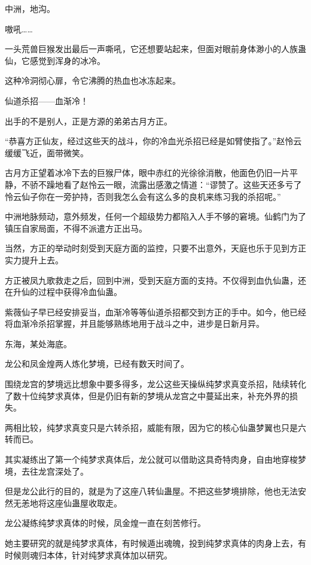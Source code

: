 
\begin{this_body}



中洲，地沟。

嗷吼……

一头荒兽巨猴发出最后一声嘶吼，它还想要站起来，但面对眼前身体渺小的人族蛊仙，它感觉到浑身的冰冷。

这种冷洞彻心扉，令它沸腾的热血也冰冻起来。

仙道杀招——血渐冷！

出手的不是别人，正是方源的弟弟古月方正。

“恭喜方正仙友，经过这些天的战斗，你的冷血光杀招已经是如臂使指了。”赵怜云缓缓飞近，面带微笑。

古月方正望着冰冷下去的巨猴尸体，眼中赤红的光徐徐消散，他面色仍旧一片平静，不骄不躁地看了赵怜云一眼，流露出感激之情道：“谬赞了。这些天还多亏了怜云仙子你在一旁护持，否则我怎么会有这么多的良机来练习我的杀招呢。”

中洲地脉频动，意外频发，任何一个超级势力都陷入人手不够的窘境。仙鹤门为了镇压自家局面，不得不派遣方正出马。

当然，方正的举动时刻受到天庭方面的监控，只要不出意外，天庭也乐于见到方正实力提升上去。

方正被凤九歌救走之后，回到中洲，受到天庭方面的支持。不仅得到血仇仙蛊，还在升仙的过程中获得冷血仙蛊。

紫薇仙子早已经安排妥当，血渐冷等等仙道杀招都交到方正的手中。如今，他已经将血渐冷杀招掌握，并且能够熟练地用于战斗之中，进步是日新月异。

东海，某处海底。

龙公和凤金煌两人炼化梦境，已经有数天时间了。

围绕龙宫的梦境远比想象中要多得多，龙公这些天操纵纯梦求真变杀招，陆续转化了数十位纯梦求真体，但是仍旧有新的梦境从龙宫之中蔓延出来，补充外界的损失。

两相比较，纯梦求真变只是六转杀招，威能有限，因为它的核心仙蛊梦翼也只是六转而已。

其实凝练出了第一个纯梦求真体后，龙公就可以借助这具奇特肉身，自由地穿梭梦境，去往龙宫深处了。

但是龙公此行的目的，就是为了这座八转仙蛊屋。不把这些梦境排除，他也无法安然无恙地将这座仙蛊屋收取走。

龙公凝练纯梦求真体的时候，凤金煌一直在刻苦修行。

她主要研究的就是纯梦求真体，有时候遁出魂魄，投到纯梦求真体的肉身上去，有时候则魂归本体，针对纯梦求真体加以研究。


\end{this_body}
